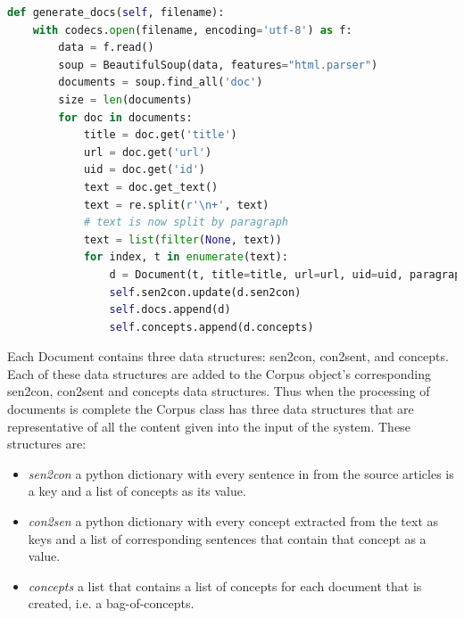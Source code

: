 \begin{lstlisting}[language=Python]
def generate_docs(self, filename):
    with codecs.open(filename, encoding='utf-8') as f:
        data = f.read()
        soup = BeautifulSoup(data, features="html.parser")
        documents = soup.find_all('doc')
        size = len(documents)
        for doc in documents:
            title = doc.get('title')
            url = doc.get('url')
            uid = doc.get('id')
            text = doc.get_text()
            text = re.split(r'\n+', text)
            # text is now split by paragraph
            text = list(filter(None, text))
            for index, t in enumerate(text):
                d = Document(t, title=title, url=url, uid=uid, paragraph=index)
                self.sen2con.update(d.sen2con)
                self.docs.append(d)
                self.concepts.append(d.concepts)
\end{lstlisting}
Each Document contains three data structures: sen2con, con2sent, and concepts. Each of these data structures are added to the Corpus object’s corresponding sen2con, con2sent and concepts data structures. Thus when the processing of documents is complete the Corpus class has three data structures that are representative of all the content given into the input of the system. These structures are:
\begin{itemize}
    \item \emph{sen2con} a python dictionary with every sentence in from the source articles is a key and a list of concepts as its value.
    \item \emph{con2sen} a python dictionary with every concept extracted from the text as keys and a list of corresponding sentences that contain that concept as a value.
    \item \emph{concepts} a list that contains a list of concepts for each document that is created, i.e. a bag-of-concepts.
\end{itemize}
